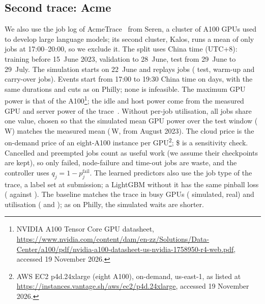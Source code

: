 \subsection{Second trace: Acme}
We also use the job log of AcmeTrace~\cite{hu24} from Seren, a cluster of \AcmePoolGpus{} A100 GPUs used to develop large language models; its second cluster, Kalos, runs a mean of only \AcmeMotKalosEveningRunningJobsMean{} jobs at 17:00--20:00, so we exclude it. The split uses China time (UTC+8): training before 15~June 2023, validation to 28~June, test from 29~June to 29~July. The simulation starts on 22~June and replays \AcmeMotSimJobs{} jobs (\AcmeMotTestJobs{} test, \AcmeMotWarmupJobs{} warm-up and \AcmeMotCarryJobs{} carry-over jobs). Events start from 17:00 to 19:30 China time on \MethEventDays{} days, with the same durations and cuts as on Philly; none is infeasible.
The maximum GPU power is that of the A100\footnote{\raggedright NVIDIA A100 Tensor Core GPU datasheet, \url{https://www.nvidia.com/content/dam/en-zz/Solutions/Data-Center/a100/pdf/nvidia-a100-datasheet-us-nvidia-1758950-r4-web.pdf}, accessed 19 November 2026.}; the idle and host power come from the measured GPU and server power of the trace~\cite{hu24}. Without per-job utilisation, all jobs share one value, chosen so that the simulated mean GPU power over the test window (\AcmeSimGpuPowerW\,W) matches the measured mean (\AcmeCdfGpuPowerW\,W, from August 2023). The cloud price is the on-demand price of an eight-A100 instance per GPU\footnote{\raggedright AWS EC2 p4d.24xlarge (eight A100), on-demand, us-east-1, as listed at \url{https://instances.vantage.sh/aws/ec2/p4d.24xlarge}, accessed 19 November 2026.}; \$\AcmeHighPrice{} is a sensitivity check. Cancelled and preempted jobs count as useful work (we assume their checkpoints are kept), so only failed, node-failure and time-out jobs are waste, and the controller uses $q_j=1-p^{\text{fail}}_j$. The learned predictors also use the job type of the trace, a label set at submission; a LightGBM without it has the same pinball loss (\AcmePredLightgbmNotypePinball{} against \AcmePredLightgbmPinball{}).
The baseline matches the trace in busy GPUs (\AcmeSimBusyGpusMean{} simulated, \AcmeRealBusyGpusMean{} real) and utilisation (\AcmeSimUtilisationMean{} and \AcmeRealUtilisationMean{}); as on Philly, the simulated waits are shorter.

